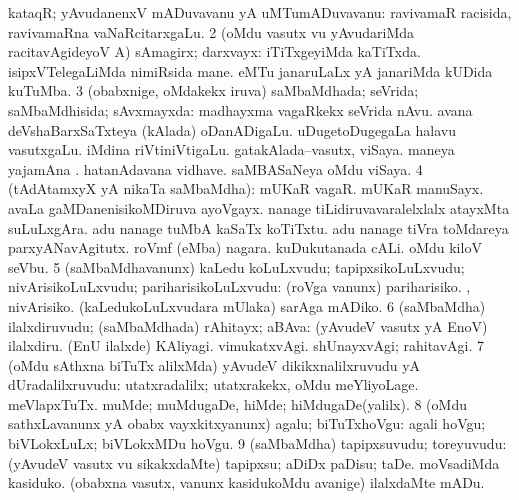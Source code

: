 {{ kataqR; yAvudanenxV mADuvavanu yA uMTumADuvavanu:
 ravivamaR racisida, ravivamaRna
vaNaRcitarxgaLu. 
\num{2} (oMdu vasutx \mo vu yAvudariMda racitavAgideyoV A) sAmagirx;
darxvayx:  iTiTxgeyiMda kaTiTxda.  isipxVTelegaLiMda nimiRsida mane. 
 eMTu janaruLaLx yA janariMda kUDida kuTuMba.
\num{3} (obabxnige, oMdakekx iruva) saMbaMdhada; seVrida;
saMbaMdhisida; sAvxmayxda:  madhayxma
vagaRkekx seVrida nAvu.  avana
deVshaBarxSaTxteya (kAlada) oDanADigaLu.
 uDugetoDugegaLa halavu vasutxgaLu. 
 iMdina riVtiniVtigaLu. 
 gatakAlada--vasutx, viSaya.  maneya yajamAna .
 hatanAdavana vidhave.
 saMBASaNeya oMdu viSaya.
\num{4} (tAdAtamxyX yA nikaTa saMbaMdha): 
mUKaR vagaR.  mUKaR manuSayx.  avaLa gaMDanenisikoMDiruva ayoVgayx.  nanage tiLidiruvavaralelxlalx atayxMta suLuLxgAra.
 adu nanage tuMbA kaSaTx koTiTxtu.
 adu nanage tiVra toMdareya
parxyANavAgitutx. 
 roVmf (eMba) nagara.  kuDukutanada cALi.
 oMdu kiloV seVbu.
\num{5} (saMbaMdhavanunx) kaLedu koLuLxvudu; tapipxsikoLuLxvudu;
nivArisikoLuLxvudu; pariharisikoLuLxvudu:  (roVga \mo
vanunx) pariharisiko. , nivArisiko. 
(kaLedukoLuLxvudara mUlaka) sarAga mADiko.
\num{6} (saMbaMdha) ilalxdiruvudu; (saMbaMdhada) rAhitayx; aBAva:
 (yAvudeV vasutx yA EnoV) ilalxdiru.  (EnU ilalxde) KAliyagi.  vimukatxvAgi.
 shUnayxvAgi; rahitavAgi.
\num{7} (oMdu sAthxna biTuTx alilxMda) yAvudeV dikikxnalilxruvudu yA
dUradalilxruvudu:  utatxradalilx; utatxrakekx,
 oMdu meYliyoLage.  meVlapxTuTx.
 muMde; muMdugaDe,  hiMde; hiMdugaDe(yalilx).
\num{8} (oMdu sathxLavanunx yA obabx vayxkitxyanunx) agalu;
biTuTxhoVgu:  agali hoVgu; biVLokxLuLx; biVLokxMDu
hoVgu.
\num{9} (saMbaMdha) tapipxsuvudu; toreyuvudu:  (yAvudeV
vasutx \mo vu sikakxdaMte) tapipxsu; aDiDx paDisu; taDe.  moVsadiMda kasiduko.  (obabxna vasutx, \mo
vanunx kasidukoMdu avanige) ilalxdaMte mADu. }}
